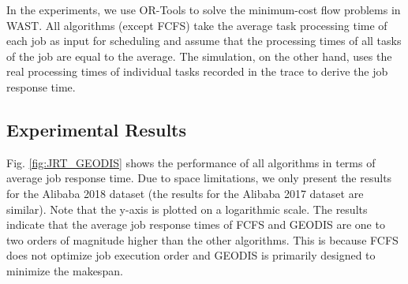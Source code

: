 %
In the experiments, we use OR-Tools \cite{ortools} to solve the minimum-cost flow problems in WAST. All algorithms (except FCFS) take the average task processing time of each job as input for scheduling and assume that the processing times of all tasks of the job are equal to the average. The simulation, on the other hand, uses the real processing times of individual tasks recorded in the trace to derive the job response time.

\subsection{Experimental Results}
Fig. \ref{fig:JRT_GEODIS} shows the performance of all algorithms in terms of average job response time. Due to space limitations, we only present the results for the Alibaba 2018 dataset 
(the results for the Alibaba 2017 dataset are similar). Note that the y-axis is plotted on a logarithmic scale. The results indicate that the average job response times of FCFS and GEODIS are one to two orders of magnitude higher than the other algorithms. This is because FCFS does not optimize job execution order and GEODIS is primarily designed to minimize the makespan.

